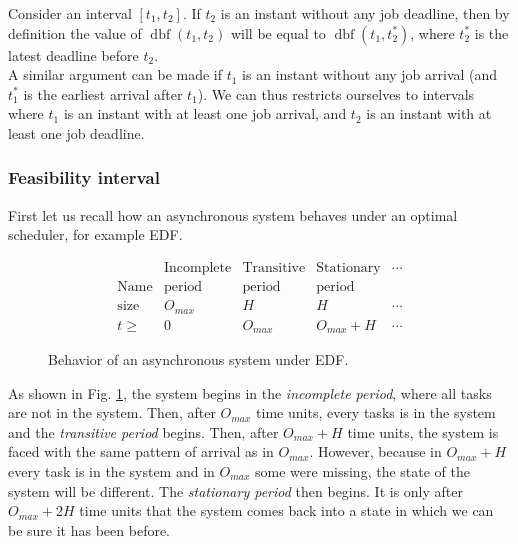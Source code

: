 \documentclass[times, 10pt,twocolumn, a4paper]{article}
\newcommand{\dbf}[1]{\operatorname{dbf}(#1)}
\begin{document}
Consider an interval $[t_1, t_2]$. If $t_2$ is an instant without any job deadline, then by definition the value of $\dbf{t_1, t_2}$ will be equal to $\dbf{t_1, t_2^*}$, where $t_2^*$ is the latest deadline before $t_2$.\\

A similar argument can be made if $t_1$ is an instant without any job arrival (and $t_1^*$ is the earliest arrival after $t_1$). We can thus restricts ourselves to intervals where $t_1$ is an instant with at least one job arrival, and $t_2$ is an instant with at least one job deadline.

  \subsubsection{Feasibility interval}

  First let us recall how an asynchronous system behaves under an optimal scheduler, for example EDF.\\

\begin{figure}[h]
	\[
		\begin{array}{r||c|c|c|l}
			& \text{Incomplete} & \text{Transitive} & \text{Stationary} & \cdots \\
			\text{Name} & \text{period} & \text{period} & \text{period}  & \\
			\hline
			\text{size} & O_{max} & H & H & \cdots \\
			\hline
			t \geqslant & 0 & O_{max} & O_{max} + H & \cdots
		\end{array}
	\]
	\begin{center}
	\caption{Behavior of an asynchronous system under EDF.}
	\label{fig:asyncBehavior}
	\end{center}
\end{figure}

As shown in Fig. \ref{fig:asyncBehavior}, the system begins in the \emph{incomplete period}, where all tasks are not in the system. Then, after $O_{max}$ time units, every tasks is in the system and the \emph{transitive period} begins. Then, after $O_{max} + H$ time units, the system is faced with the same pattern of arrival as in $O_{max}$. However, because in $O_{max} + H$ every task is in the system and in $O_{max}$ some were missing, the state of the system will be different. The \emph{stationary period} then begins. It is only after $O_{max} + 2H$ time units that the system comes back into a state in which we can be sure it has been before.\\
\end{document}
